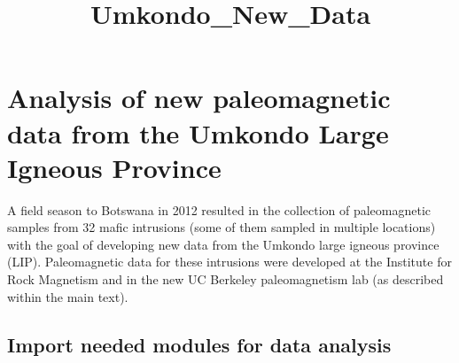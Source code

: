 \documentclass{article}
\title{Umkondo\_New\_Data}
\begin{document}
    
    
    \maketitle
    
    

    
    \section{Analysis of new paleomagnetic data from the Umkondo Large
Igneous
Province}\label{analysis-of-new-paleomagnetic-data-from-the-umkondo-large-igneous-province}

    A field season to Botswana in 2012 resulted in the collection of
paleomagnetic samples from 32 mafic intrusions (some of them sampled in
multiple locations) with the goal of developing new data from the
Umkondo large igneous province (LIP). Paleomagnetic data for these
intrusions were developed at the Institute for Rock Magnetism and in the
new UC Berkeley paleomagnetism lab (as described within the main text).

    \subsection{Import needed modules for data
analysis}\label{import-needed-modules-for-data-analysis}
\end{document}

